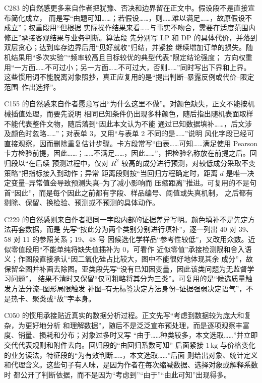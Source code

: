 C283 的自然感更多来自作者把犹豫、否决和边界留在正文中。假设段不是直接宣布简化成立，
而是写“由题可知……；若假设……，则……难以满足……，故原假设不成立”；权重段用“但根据
实际操作结果来看……与事实不吻合，需要在适度范围内修正”承接客观结果与业务判断。算法段
先分别写 LP 和 DP 的具体代价，并落到双层贪心；达到库存边界后用“见好就收”归结，并紧接
继续增加订单的损失。随机结果用“多次实验”“频率较高且目标较优的典型代表”限定结论强度；
方向权重用“一方面……不可过小；另一方面……不可过大，否则……”同时写出下界和上界。
这些惯用词不能脱离对象照抄，真正应复用的是“提出判断--暴露反例或代价--限定范围--作出选择”。

C155 的自然感来自作者愿意写出“为什么这里不做”。对颜色缺失，正文不能按机械插值处理，而要先说明
相同已知条件仍出现多种颜色，随后指出随机表面取样不能代表整件文物，随后落到“因此本文认为不能
通过已知数据填补……，后文涉及颜色时忽略……”；对表单 3，又用“与表单 2 不同的是……”说明
风化字段已经可直接观察，因而删除重复估计步骤。卡方段常写“由表……可知……满足使用 Pearson
卡方检验前提，因此……；……不满足……，因此……”，把检验名称放在前提之后。回归段以“在后续
预测过程中，仅对 $R^2$ 较高的成分进行预测，对较低成分采取不变策略”把指标接入到动作；异常
距离段则按“当回归方程确定时，距离 $d$ 是唯一决定变量--异常值会导致预测失真--为了减小影响而
压缩距离”推进。可复用的不是句首“因此”，而是每个因此之前都有字段、样品编号、阈值或失真机制，
之后都有剔除、保留、换检验、预测或不预测的具体动作。

C229 的自然感则来自作者把同一字段内部的证据差异写明。颜色填补不是先定方法再套数据，而是
先写“按此分为两个类别分别进行填补”，逐一列出 40 对 39、58 对 11 的参照关系；19、48 号
因候选化学样品“参考性较低”，又改用众数。近似零值段用“不能单纯将缺失值插补为 0，可看作
近似零值”承接检测限和舍入语义；作图段直接承认“因二氧化硅占比较大，图中不能很好地体现其余
成分”，故保留全图并补画去除图。亚类段先写“没有已知因变量，因此该类问题为无监督学习问题”，
结果不清时又保留“仅可粗略将其分为三类”。可复用的是“候选质量触发方法分流--图形局限触发
补图--有无标签决定方法身份--证据强弱决定语气”，不是热卡、聚类或“故”字本身。

C050 的惯用承接贴近真实的数据分析过程。正文先写“考虑到数据较为庞大和复杂，为更好地分析
和理解数据”，随后不是泛泛宣布预处理，而是逐项观察丰富度、销量、损耗和分布；对象过多时又写
“由于……种类较多，本文选取……”并立即交代代表规则和附件去向。回归段的“由回归系数可知”
后面紧接 $1\,\mathrm{kg}$ 与价格变化的业务读法，特征段的“为有效判断……，本文选取……”后面
则给出对象、统计定义和代理含义。这些句子有人味，是因为作者在每次缩减数据、选择对象或解释系数时
都公开了判断依据，而不是因为“考虑到”“由于”“由此可知”出现得多。

